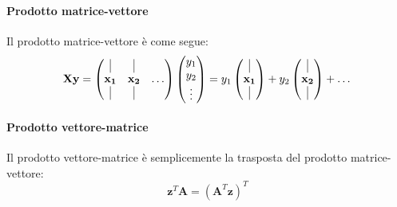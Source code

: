 \documentclass{article}
\begin{document}
            \paragraph{Prodotto matrice-vettore}
                Il prodotto matrice-vettore è come segue:
                \[ \mathbf{Xy} = 
                        \begin{pmatrix}
                            \vline          & \vline        & \\
                            \mathbf{x_1}    & \mathbf{x_2}  & \dots \\
                            \vline          & \vline       & \\
                        \end{pmatrix}
                        \begin{pmatrix}
                            y_1 \\
                            y_2 \\
                            \vdots
                        \end{pmatrix} 
                        =
                        y_1 \begin{pmatrix}
                            \vline \\
                            \mathbf{x_1} \\
                            \vline
                        \end{pmatrix}
                        +
                        y_2 \begin{pmatrix}
                            \vline \\
                            \mathbf{x_2} \\
                            \vline
                        \end{pmatrix}
                        +
                        \dots \]
            \paragraph{Prodotto vettore-matrice}
                Il prodotto vettore-matrice è semplicemente la trasposta del prodotto matrice-vettore:
                        \[\mathbf{z}^T\mathbf{A} = (\mathbf{A}^T\mathbf{z})^T\]
\end{document}
